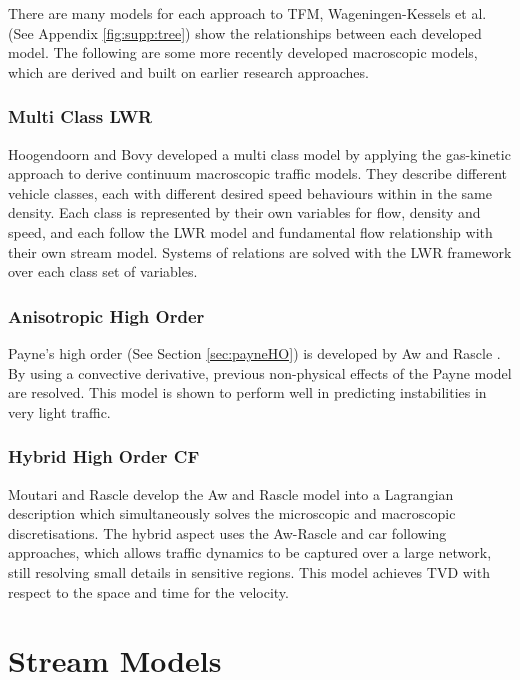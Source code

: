 	There are many models for each approach to TFM, Wageningen-Kessels et al. \cite{Kessels15} (See Appendix \ref{fig:supp:tree}) show the relationships between each developed model. The following are some more recently developed macroscopic models, which are derived and built on earlier research approaches.

\subsubsection*{Multi Class LWR}

	Hoogendoorn and Bovy \cite{HoogendoornBovy99} developed a multi class model by applying the gas-kinetic approach to derive continuum macroscopic traffic models. They describe different vehicle classes, each with different desired speed behaviours within in the same density. Each class is represented by their own variables for flow, density and speed, and each follow the LWR model and fundamental flow relationship with their own stream model. Systems of relations are solved with the LWR framework over each class set of variables. 

\subsubsection*{Anisotropic High Order}

	Payne's high order \cite{Payne71} (See Section \ref{sec:payneHO}) is developed by Aw and Rascle \cite{AwRascle00}. By using a convective derivative, previous non-physical effects of the Payne model are resolved. This model is shown to perform well in predicting instabilities in very light traffic.
	
\subsubsection*{Hybrid High Order CF}

	Moutari and Rascle \cite{MoutariRascle07} develop the Aw and Rascle \cite{AwRascle00} model into a Lagrangian description which simultaneously solves the microscopic and macroscopic discretisations. The hybrid aspect uses the Aw-Rascle and car following approaches, which allows traffic dynamics to be captured over a large network, still resolving small details in sensitive regions. This model achieves TVD with respect to the space and time for the velocity.

\section{Stream Models}
\label{sec:streammodels}

